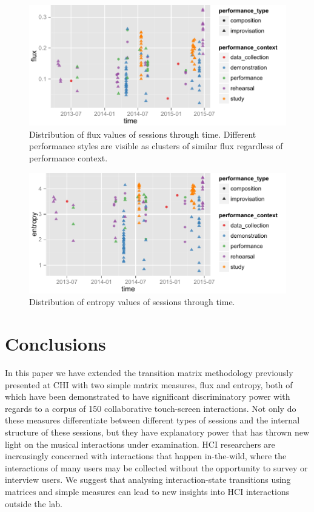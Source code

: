 \documentclass{sigchi}
\begin{document}
\begin{figure}
  \centering
  \includegraphics[width=\linewidth]{figures/flux-through-time}
  \caption{Distribution of flux values of sessions through time.
    Different performance styles are visible as clusters of similar
    flux regardless of performance context.
    \label{fig:flux-through-time}}
\end{figure}

\begin{figure}
  \centering
  \includegraphics[width=\linewidth]{figures/entropy-through-time}
  \caption{Distribution of entropy values of sessions through time.
    \label{fig:entropy-through-time}}
\end{figure}


\section{Conclusions}

In this paper we have extended the transition matrix methodology
previously presented at CHI with two simple matrix measures, flux and
entropy, both of which have been demonstrated to have significant
discriminatory power with regards to a corpus of 150 collaborative
touch-screen interactions. Not only do these measures differentiate
between different types of sessions and the internal structure of
these sessions, but they have explanatory power that has thrown new
light on the musical interactions under examination. HCI researchers
are increasingly concerned with interactions that happen in-the-wild,
where the interactions of many users may be collected without the
opportunity to survey or interview users. We suggest that analysing
interaction-state transitions using matrices and simple measures can
lead to new insights into HCI interactions outside the lab.
\end{document}
